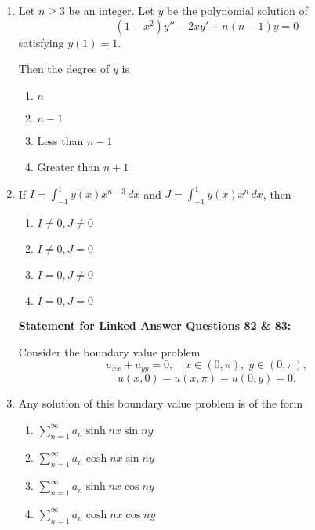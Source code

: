 \documentclass[journal,12pt,onecolumn]{IEEEtran}
\theoremstyle{remark}
\begin{document}
\begin{enumerate}
\item Let \(n \geq 3\) be an integer. Let \(y\) be the polynomial solution of  
\[
(1 - x^2) y'' - 2x y' + n(n-1) y = 0
\]  
satisfying \(y(1) = 1\).

Then the degree of \(y\) is
\\[-0.3em]\makebox[\textwidth][r]{\textit{[GATE EE 2025]}}

\begin{multicols}{2}
\begin{enumerate}[label=(\Alph*)]
\item \(n\)
\item \(n-1\)
\item Less than \(n-1\)
\item Greater than \(n+1\)
\end{enumerate}
\end{multicols}

\item If \(I = \int_{-1}^{1} y(x)x^{n-3} \, dx\) and \(J = \int_{-1}^{1} y(x)x^n \, dx\), then
\\[-0.3em]\makebox[\textwidth][r]{\textit{[GATE EE 2025]}}

\begin{multicols}{2}
\begin{enumerate}[label=(\Alph*)]
\item \(I \neq 0, J \neq 0\)
\item \(I \neq 0, J = 0\)
\item \(I = 0, J \neq 0\)
\item \(I = 0, J = 0\)
\end{enumerate}
\end{multicols}



\textbf{Statement for Linked Answer Questions 82 \& 83:}  

 Consider the boundary value problem  
\[
u_{xx} + u_{yy} = 0,\quad x \in (0, \pi), \; y \in (0, \pi),
\]
\[
u(x,0) = u(x,\pi) = u(0,y) = 0.
\]

\item Any solution of this boundary value problem is of the form
\\[-0.3em]\makebox[\textwidth][r]{\textit{[GATE EE 2025]}}

\begin{multicols}{2}
\begin{enumerate}[label=(\Alph*)]
\item \(\sum_{n=1}^{\infty} a_n \sinh nx \sin ny\)
\item \(\sum_{n=1}^{\infty} a_n \cosh nx \sin ny\)
\item \(\sum_{n=1}^{\infty} a_n \sinh nx \cos ny\)
\item \(\sum_{n=1}^{\infty} a_n \cosh nx \cos ny\)
\end{enumerate}
\end{multicols}


\end{enumerate}
\end{document}
